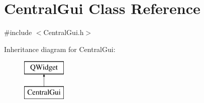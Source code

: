 \hypertarget{class_central_gui}{\section{Central\-Gui Class Reference}
\label{class_central_gui}
}


{\ttfamily \#include $<$Central\-Gui.\-h$>$}

Inheritance diagram for Central\-Gui\-:\begin{figure}[H]
\begin{center}
\leavevmode
\includegraphics[height=2.000000cm]{class_central_gui}
\end{center}
\end{figure}
